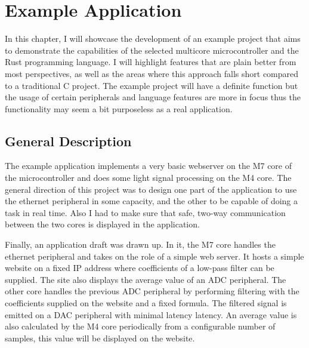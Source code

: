 
\chapter{Example Application}

In this chapter, I will showcase the development of an example project that aims to demonstrate the capabilities of the selected multicore microcontroller and the Rust programming language. I will highlight features that are plain better from most perspectives, as well as the areas where this approach falls short compared to a traditional C project. The example project will have a definite function but the usage of certain peripherals and language features are more in focus thus the functionality may seem a bit purposeless as a real application.

\section{General Description}

The example application implements a very basic webserver on the M7 core of the microcontroller and does some light signal processing on the M4 core. The general direction of this project was to design one part of the application to use the ethernet peripheral in some capacity, and the other to be capable of doing a task in real time. Also I had to make sure that safe, two-way communication between the two cores is displayed in the application.

Finally, an application draft was drawn up. In it, the M7 core handles the ethernet peripheral and takes on the role of a simple web server. It hosts a simple website on a fixed IP address where coefficients of a low-pass filter can be supplied. The site also displays the average value of an ADC peripheral. The other core handles the previous ADC peripheral by performing filtering with the coefficients supplied on the website and a fixed formula. The filtered signal is emitted on a DAC peripheral with minimal latency latency. An average value is also calculated by the M4 core periodically from a configurable number of samples, this value will be displayed on the website.

